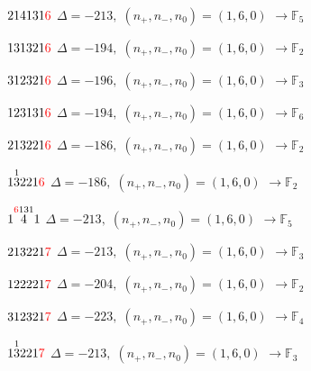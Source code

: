 \documentclass[10pt]{article}
\begin{document}
$214131\textcolor{red}{6}$ \quad $\Delta=-213,\; (n_+,n_-,n_0)=(1,6,0)$ \quad $\to \mathbb{F}_{5}$

\smallskip

$131321\textcolor{red}{6}$ \quad $\Delta=-194,\; (n_+,n_-,n_0)=(1,6,0)$ \quad $\to \mathbb{F}_{2}$

\smallskip

$312321\textcolor{red}{6}$ \quad $\Delta=-196,\; (n_+,n_-,n_0)=(1,6,0)$ \quad $\to \mathbb{F}_{3}$

\smallskip

$123131\textcolor{red}{6}$ \quad $\Delta=-194,\; (n_+,n_-,n_0)=(1,6,0)$ \quad $\to \mathbb{F}_{6}$

\smallskip

$213221\textcolor{red}{6}$ \quad $\Delta=-186,\; (n_+,n_-,n_0)=(1,6,0)$ \quad $\to \mathbb{F}_{2}$

\smallskip

$1\overset{1}{3}221\textcolor{red}{6}$ \quad $\Delta=-186,\; (n_+,n_-,n_0)=(1,6,0)$ \quad $\to \mathbb{F}_{2}$

\smallskip

$1\overset{\textcolor{red}{6}131}{4}1$ \quad $\Delta=-213,\; (n_+,n_-,n_0)=(1,6,0)$ \quad $\to \mathbb{F}_{5}$

\smallskip

$213221\textcolor{red}{7}$ \quad $\Delta=-213,\; (n_+,n_-,n_0)=(1,6,0)$ \quad $\to \mathbb{F}_{3}$

\smallskip

$122221\textcolor{red}{7}$ \quad $\Delta=-204,\; (n_+,n_-,n_0)=(1,6,0)$ \quad $\to \mathbb{F}_{2}$

\smallskip

$312321\textcolor{red}{7}$ \quad $\Delta=-223,\; (n_+,n_-,n_0)=(1,6,0)$ \quad $\to \mathbb{F}_{4}$

\smallskip

$1\overset{1}{3}221\textcolor{red}{7}$ \quad $\Delta=-213,\; (n_+,n_-,n_0)=(1,6,0)$ \quad $\to \mathbb{F}_{3}$

\smallskip
\end{document}
